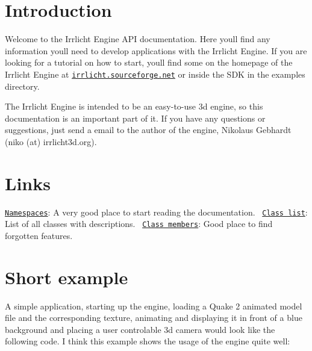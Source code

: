 \hypertarget{index_intro}{}\section{Introduction}\label{index_intro}
Welcome to the Irrlicht Engine A\+PI documentation. Here you\textquotesingle{}ll find any information you\textquotesingle{}ll need to develop applications with the Irrlicht Engine. If you are looking for a tutorial on how to start, you\textquotesingle{}ll find some on the homepage of the Irrlicht Engine at \href{http://irrlicht.sourceforge.net}{\tt irrlicht.\+sourceforge.\+net} or inside the S\+DK in the examples directory.

The Irrlicht Engine is intended to be an easy-\/to-\/use 3d engine, so this documentation is an important part of it. If you have any questions or suggestions, just send a email to the author of the engine, Nikolaus Gebhardt (niko (at) irrlicht3d.\+org).\hypertarget{index_links}{}\section{Links}\label{index_links}
\href{namespaces.html}{\tt Namespaces}\+: A very good place to start reading the documentation.~\newline
 \href{annotated.html}{\tt Class list}\+: List of all classes with descriptions.~\newline
 \href{functions.html}{\tt Class members}\+: Good place to find forgotten features.~\newline
\hypertarget{index_irrexample}{}\section{Short example}\label{index_irrexample}
A simple application, starting up the engine, loading a Quake 2 animated model file and the corresponding texture, animating and displaying it in front of a blue background and placing a user controlable 3d camera would look like the following code. I think this example shows the usage of the engine quite well\+:


